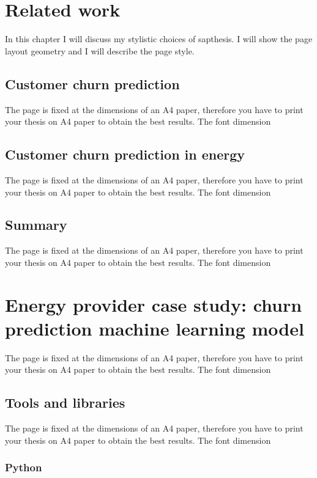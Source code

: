 \documentclass[LaM,binding=0.6cm, english]{sapthesis}
\begin{document}
\chapter{Related work}

In this chapter I will discuss my stylistic choices of \textsf{sapthesis}.
I will show the page layout geometry and I will describe the page style.

\section{Customer churn prediction}

The page is fixed at the dimensions of an A4 paper, therefore you have to print your thesis on A4 paper to obtain the best results. The font dimension

\section{Customer churn prediction in energy}

The page is fixed at the dimensions of an A4 paper, therefore you have to print your thesis on A4 paper to obtain the best results. The font dimension

\section{Summary}

The page is fixed at the dimensions of an A4 paper, therefore you have to print your thesis on A4 paper to obtain the best results. The font dimension

\chapter{Energy provider case study: churn prediction machine learning model}

The page is fixed at the dimensions of an A4 paper, therefore you have to print your thesis on A4 paper to obtain the best results. The font dimension

\section{Tools and libraries}

The page is fixed at the dimensions of an A4 paper, therefore you have to print your thesis on A4 paper to obtain the best results. The font dimension


\subsection{Python}
\end{document}
